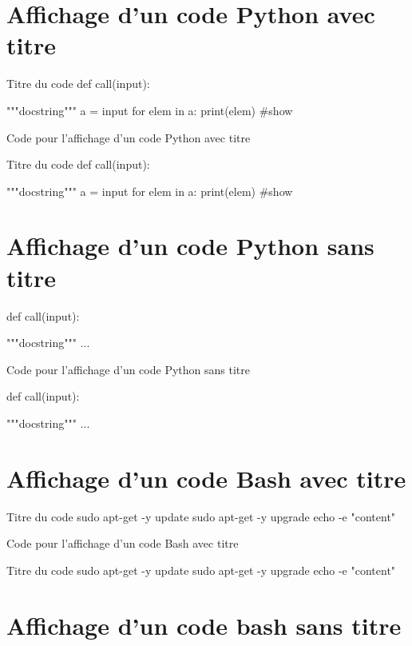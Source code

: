 \section{Affichage d'un code Python avec titre}


\begin{Python}{Titre du code}
def call(input):

  """docstring"""
  a = input
  for elem in a:
    print(elem) #show
\end{Python}

\begin{Latex}{Code pour l'affichage d'un code Python avec titre}
  \begin{Python}{Titre du code}
    def call(input):
    
      """docstring"""
      a = input
      for elem in a:
        print(elem) #show
    \end{Python}
\end{Latex}

\section{Affichage d'un code Python sans titre}


\begin{Python}
def call(input):

  """docstring"""
  ...
\end{Python}

\begin{Latex}{Code pour l'affichage d'un code Python sans titre}
  \begin{Python}
    def call(input):
    
      """docstring"""
      ...
    \end{Python}
\end{Latex}


\section{Affichage d'un code Bash avec titre}


\begin{Bash}{Titre du code}
sudo apt-get -y update
sudo apt-get -y upgrade
echo -e "content"
\end{Bash}

\begin{Latex}{Code pour l'affichage d'un code Bash avec titre}
  \begin{Bash}{Titre du code}
    sudo apt-get -y update
    sudo apt-get -y upgrade
    echo -e "content"
    \end{Bash}
\end{Latex}

\section{Affichage d'un code bash sans titre}






